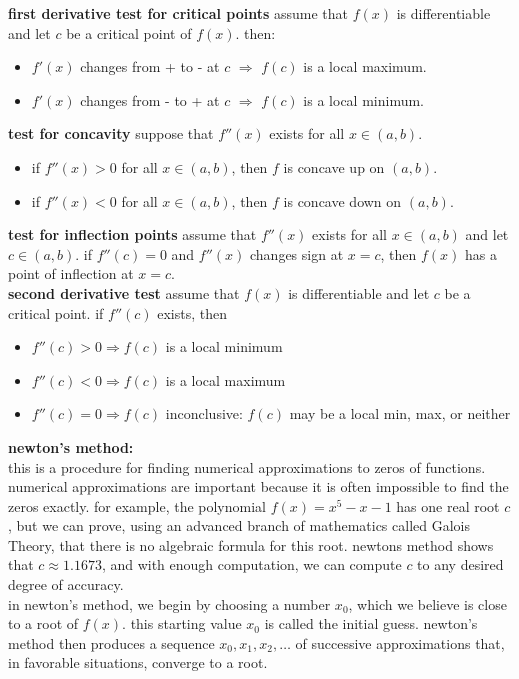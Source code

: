 \documentclass{article}
\begin{document}
\textbf{first derivative test for critical points} assume that $f(x)$ is differentiable and let $c$ be a critical point of $f(x)$. then:
	\begin{itemize}
		\item $f'(x)$ changes from + to - at $c$ $\Rightarrow$ $f(c)$ is a local maximum.
		\item $f'(x)$ changes from - to + at $c$ $\Rightarrow$ $f(c)$ is a local minimum. 
	\end{itemize}

\textbf{test for concavity} suppose that $f''(x)$ exists for all $x \in (a, b)$.
	\begin{itemize}
		\item if $f''(x) > 0$ for all $x \in (a, b)$, then $f$ is concave up on $(a, b)$.
		\item if $f''(x) < 0$ for all $x \in (a, b)$, then $f$ is concave down on $(a, b)$. 
	\end{itemize}

\textbf{test for inflection points} assume that $f''(x)$ exists for all $x \in (a, b)$ and let $c \in (a, b)$. if $f''(c) = 0$ and $f''(x)$ changes sign at $x = c$, then $f(x)$ has a point of inflection at $x = c$.\\

\textbf{second derivative test} assume that $f(x)$ is differentiable and let $c$ be a critical point. if $f''(c)$ exists, then
	\begin{itemize}
		\item $f''(c) > 0 \Rightarrow f(c)$ is a local minimum
		\item $f''(c) < 0 \Rightarrow f(c)$ is a local maximum 
		\item $f''(c) = 0 \Rightarrow f(c)$ inconclusive: $f(c)$ may be a local min, max, or neither
	\end{itemize}

\textbf{newton's method:}\\
this is a procedure for finding numerical approximations to zeros of functions. numerical approximations are important because it is often impossible to find the zeros exactly. for example, the polynomial $f(x) = x^5 - x - 1$ has one real root $c$, but we can prove, using an advanced branch of mathematics called Galois Theory, that there is no algebraic formula for this root. newtons method shows that $c \approx 1.1673$, and with enough computation, we can compute $c$ to any desired degree of accuracy.\\

in newton's method, we begin by choosing a number $x_0$, which we believe is close to a root of $f(x)$. this starting value $x_0$ is called the initial guess. newton's method then produces a sequence $x_0, x_1, x_2, \ldots$ of successive approximations that, in favorable situations, converge to a root.\\
\end{document}
